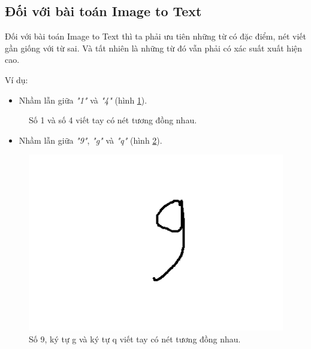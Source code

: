 \subsection{Đối với bài toán Image to Text}
Đối với bài toán Image to Text  thì ta phải ưu tiên những từ có đặc điểm, nét viết gần giống với từ sai. Và tất nhiên là những từ đó vẫn phải có xác suất xuất hiện cao.

Ví dụ:
\begin{itemize}
    \item Nhầm lẫn giữa \textit{"1"} và \textit{"4"} (hình \ref{fig:onefour}).
\end{itemize}
\begin{figure}[H]
    \centering
    \qquad
    \caption{Số 1 và số 4 viết tay có nét tương đồng nhau.}%
    \label{fig:onefour}
\end{figure}

\begin{itemize}
    \item Nhầm lẫn giữa \textit{"9"}, \textit{"g"} và \textit{"q"} (hình \ref{fig:ninegq}).
\end{itemize}
\begin{figure}[H]
	\centering
		\includegraphics[width=0.5\columnwidth]{books/artificial-neural-network/chapter07/figure-sec4/9-g-q.png}
		\centering
	\caption{Số 9, ký tự g và ký tự q viết tay có nét tương đồng nhau.}
	\label{fig:ninegq}
\end{figure}

